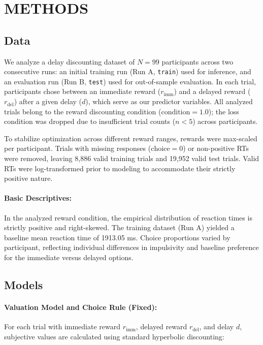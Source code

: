 \documentclass[11pt,a4paper]{article}
\theoremstyle{definition}
\begin{document}
\section{METHODS}

\subsection{Data}

We analyze a delay discounting dataset of $N=99$ participants across two consecutive runs: an initial training run (Run A, \texttt{train}) used for inference, and an evaluation run (Run B, \texttt{test}) used for out-of-sample evaluation. In each trial, participants chose between an immediate reward ($r_{\text{imm}}$) and a delayed reward ($r_{\text{del}}$) after a given delay ($d$), which serve as our predictor variables. All analyzed trials belong to the reward discounting condition ($\text{condition} = 1.0$); the loss condition was dropped due to insufficient trial counts ($n<5$) across participants.

To stabilize optimization across different reward ranges, rewards were max-scaled per participant. Trials with missing responses ($\text{choice} = 0$) or non-positive RTs were removed, leaving 8,886 valid training trials and 19,952 valid test trials. Valid RTs were log-transformed prior to modeling to accommodate their strictly positive nature.

\paragraph{Basic Descriptives:}
In the analyzed reward condition, the empirical distribution of reaction times is strictly positive and right-skewed. The training dataset (Run A) yielded a baseline mean reaction time of 1913.05 ms. Choice proportions varied by participant, reflecting individual differences in impulsivity and baseline preference for the immediate versus delayed options.

\subsection{Models}

\paragraph{Valuation Model and Choice Rule (Fixed):}
For each trial with immediate reward $r_{\text{imm}}$, delayed reward $r_{\text{del}}$, and delay $d$, subjective values are calculated using standard hyperbolic discounting:
\end{document}
